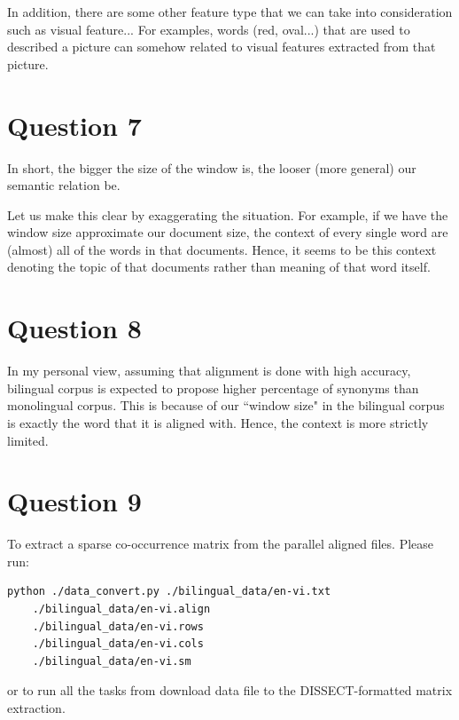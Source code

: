 \documentclass[12pt]{article}
\begin{document}
In addition, there are some other feature type that we can take into consideration such as visual feature... For examples, words (red, oval...) that are used to described a picture can somehow related to visual features extracted from that picture.

\section{Question 7}
In short, the bigger the size of the window is, the looser (more general) our semantic relation be.

Let us make this clear by exaggerating the situation. For example, if we have the window size approximate our document size, the context of every single word are (almost) all of the words in that documents. Hence, it seems to be this context denoting the topic of that documents rather than meaning of that word itself.

\section{Question 8}
In my personal view, assuming that alignment is done with high accuracy, bilingual corpus is expected to propose higher percentage of synonyms than monolingual corpus. This is because of our ``window size" in the bilingual corpus is exactly the word that it is aligned with. Hence, the context is more strictly limited.

\section{Question 9}
To extract a sparse co-occurrence matrix from the parallel aligned files. Please run: 
\begin{verbatim}
python ./data_convert.py ./bilingual_data/en-vi.txt 
	./bilingual_data/en-vi.align
	./bilingual_data/en-vi.rows
	./bilingual_data/en-vi.cols
	./bilingual_data/en-vi.sm
\end{verbatim}
or  to run all the tasks from download data file to the DISSECT-formatted matrix extraction.
\end{document}
